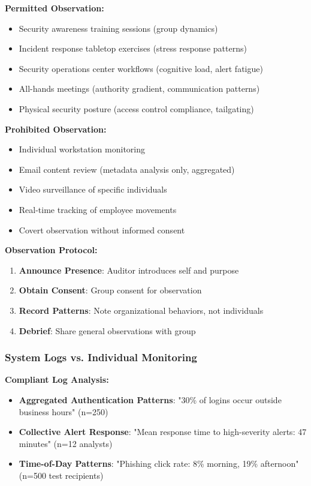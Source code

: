 \documentclass[11pt,a4paper]{article}
\begin{document}
\textbf{Permitted Observation:}
\begin{itemize}
\item Security awareness training sessions (group dynamics)
\item Incident response tabletop exercises (stress response patterns)
\item Security operations center workflows (cognitive load, alert fatigue)
\item All-hands meetings (authority gradient, communication patterns)
\item Physical security posture (access control compliance, tailgating)
\end{itemize}

\textbf{Prohibited Observation:}
\begin{itemize}
\item Individual workstation monitoring
\item Email content review (metadata analysis only, aggregated)
\item Video surveillance of specific individuals
\item Real-time tracking of employee movements
\item Covert observation without informed consent
\end{itemize}

\textbf{Observation Protocol:}

\begin{enumerate}
\item \textbf{Announce Presence}: Auditor introduces self and purpose
\item \textbf{Obtain Consent}: Group consent for observation
\item \textbf{Record Patterns}: Note organizational behaviors, not individuals
\item \textbf{Debrief}: Share general observations with group
\end{enumerate}

\subsubsection{System Logs vs. Individual Monitoring}

\textbf{Compliant Log Analysis:}

\begin{itemize}
\item \textbf{Aggregated Authentication Patterns}: "30\% of logins occur outside business hours" (n=250)
\item \textbf{Collective Alert Response}: "Mean response time to high-severity alerts: 47 minutes" (n=12 analysts)
\item \textbf{Time-of-Day Patterns}: "Phishing click rate: 8\% morning, 19\% afternoon" (n=500 test recipients)
\end{itemize}
\end{document}
